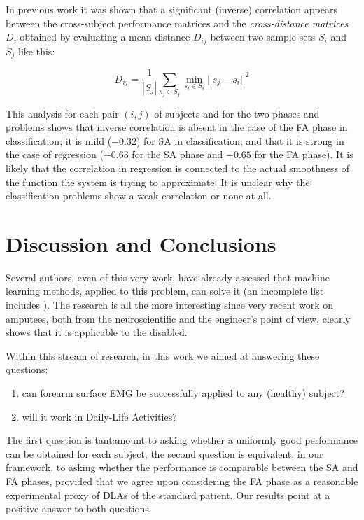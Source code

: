\documentclass[10pt]{bmc_article}
\newenvironment{bmcformat}{\begin{raggedright}\baselineskip20pt\sloppy\setboolean{publ}{false}}{\end{raggedright}\baselineskip20pt\sloppy}
\begin{document}
\begin{bmcformat}
In previous work it was shown that a significant (inverse) correlation
appears between the cross-subject performance matrices and the
\emph{cross-distance matrices} $D$,
obtained by evaluating a mean distance $D_{ij}$ between
two sample sets $S_i$ and $S_j$ like this:

$$ D_{ij} = \frac{1}{|S_j|} \sum_{s_j \in S_j}{\min_{s_i \in S_i}{ ||s_j-s_i||^2 } } $$

This analysis for each pair $(i,j)$ of subjects and for
the two phases and problems shows that inverse correlation
is absent in the case of the FA phase in classification; it is mild
($-0.32$) for SA in classification; and that it is strong in the case
of regression ($-0.63$ for the SA phase and $-0.65$ for the FA
phase). It is likely that the correlation in regression is connected
to the actual smoothness of the function the system is trying to
approximate. It is unclear why the classification problems show a
weak correlation or none at all.

\section*{Discussion and Conclusions}
\label{sec:discussion}

Several authors, even of this very work, have already assessed that
machine learning methods, applied to this problem, can solve it (an
incomplete list includes
\cite{chan2005,tsukamoto,englehart08,cipriani,2008.BioCyb}). The
research is all the more interesting since very recent work on
amputees, both from the neuroscientific \cite{sirigu1,sirigu2}
and the engineer's \cite{sebelius,2009.JPP,ramos}
point of view, clearly shows that it is applicable to the disabled.

Within this stream of research, in this work we aimed at answering
these questions:

\begin{enumerate}

  \item can forearm surface EMG be successfully applied to any (healthy) subject?

  \item will it work in Daily-Life Activities?

\end{enumerate}

The first question is tantamount to asking whether a uniformly good
performance can be obtained for each subject; the second question is
equivalent, in our framework, to asking whether the performance is
comparable between the SA and FA phases, provided that we agree upon
considering the FA phase as a reasonable experimental proxy of DLAs
of the standard patient. Our results point at a positive answer to
both questions.


\end{bmcformat}
\end{document}
